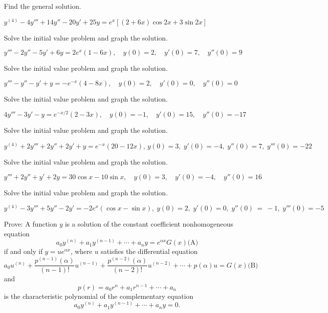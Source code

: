 \documentclass{ximera}
\begin{document}
\begin{problem}\label{exer:9.3.68}   Find the general solution. 

$y^{(4)}-4y'''+14y''-20y'+25y=e^x\left[(2+6x)\cos
2x+3\sin2x\right]$
\end{problem}

\begin{problem}\label{exer:9.3.69} Solve the initial value problem and graph the solution.

$y'''-2y''-5y'+6y=2e^x(1-6x),\quad
y(0)=2,
\quad y'(0)=7,\quad y''(0)=9$
\end{problem}

\begin{problem}\label{exer:9.3.70} Solve the initial value problem and graph the solution.

$y'''-y''-y'+y=-e^{-x}(4-8x),\quad
y(0)=2,
\quad y'(0)=0,\quad y''(0)=0$
\end{problem}

\begin{problem}\label{exer:9.3.71} Solve the initial value problem and graph the solution. 

$4y'''-3y'-y=e^{-x/2}(2-3x),\quad
y(0)=-1,
\quad y'(0)=15,\quad y''(0)=-17$
\end{problem}

\begin{problem}\label{exer:9.3.72}  Solve the initial value problem and graph the solution.

$y^{(4)}+2y'''+2y''+2y'+y=e^{-x}(20-12x),\,
y(0)=3,\; y'(0)=-4,\; y''(0)=7,\; y'''(0)=-22$
\end{problem}

\begin{problem}\label{exer:9.3.73}  Solve the initial value problem and graph the solution.

$y'''+2y''+y'+2y=30\cos x-10\sin x,
\quad y(0)=3,\quad y'(0)=-4,\quad y''(0)=16$
\end{problem}

\begin{problem}\label{exer:9.3.74}  Solve the initial value problem and graph the solution.

$y^{(4)}-3y'''+5y''-2y'=-2e^x(\cos x-\sin
x),\; y(0)=2,\; y'(0)=0,\; y''(0)~=~-1, \; y'''(0)=-5$
\end{problem}

\begin{problem}\label{exer:9.3.75}
Prove:
A function $y$ is a solution of the constant coefficient
nonhomogeneous equation
$$
a_0y^{(n)}+a_1y^{(n-1)}+\cdots+a_ny=e^{\alpha x}G(x)
\text{(A)}
$$
if and only if $y=ue^{\alpha x}$, where $u$ satisfies the differential
equation
$$
a_0u^{(n)}+\frac{p^{(n-1)}(\alpha)}{(n-1)!}u^{(n-1)}+
\frac{p^{(n-2)}(\alpha)}{(n-2)!}u^{(n-2)}+\cdots+p(\alpha)u=G(x)
\text{(B)}
$$
and
$$
p(r)=a_0r^n+a_1r^{n-1} + \cdots + a_n
$$
is the characteristic polynomial of the complementary equation
$$
a_0y^{(n)}+a_1y^{(n-1)}+\cdots+a_ny=0.
$$
\end{problem}
\end{document}
